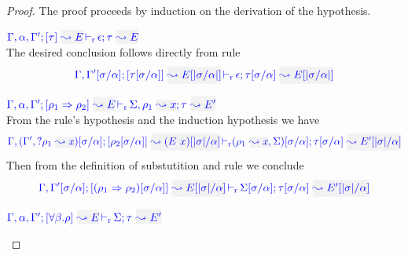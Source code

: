 \begin{proof}
The proof proceeds by induction on the derivation of the hypothesis.
\begin{description}
\setlength{\itemsep}{1em}
\item[\fbox{\rref{M-Simp}}]\quad$\dmres{\tenv,\alpha,\tenv'}{\type}{E}{\type}{E}{\epsilon}$\\

The desired conclusion follows directly from rule 
\begin{equation*}
\dmres{\tenv,\tenv'[\suty/\alpha]}{\type[\suty/\alpha]}{E[|\suty/\alpha|]}{\type[\suty/\alpha]}{E[|\suty/\alpha|]}{\epsilon}
\end{equation*}

\item[\fbox{\rref{M-IApp}}]\quad$\dmres{\tenv,\alpha,\tenv'}{\rulet_1 \To \rulet_2}{E}{\type}{E'}{\Sigma,\ie{\rulet_1}{x}}$\\

From the rule's hypothesis and the induction hypothesis we have 
\begin{equation*}
\dmres{\tenv,(\tenv',\envi{\rulet_1}{x})[\suty/\alpha]}{\rulet_2[\suty/\alpha]}{(E~x)[|\suty|/\alpha]}{\type[\suty/\alpha]}{E'[|\suty|/\alpha]}{(\rulet_1~\gbox{\leadsto x},\Sigma)[\suty/\alpha]}
\end{equation*}
  Then from the definition of substutition and rule  we conclude
\begin{equation*}
  \dmres{\tenv,\tenv'[\suty/\alpha]}{(\rulet_1 \To \rulet_2)[\suty/\alpha]}{E[|\suty|/\alpha]}{\type[\suty/\alpha]}{E'[|\suty|/\alpha]}{\Sigma[\suty/\alpha]}
\end{equation*}

\item[\fbox{\rref{M-TApp}}]\quad$\dmres{\tenv,\alpha,\tenv'}{\tall{\beta}{\rulet}}{E}{\type}{E'}{\Sigma}$\\


\end{description}
\end{proof}
